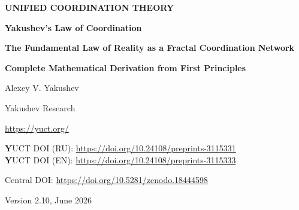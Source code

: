 \documentclass[12pt,a4paper]{article}
\theoremstyle{remark}
\begin{document}
	
	\begin{titlepage}
		\centering
		\vspace*{2cm}
		
		{\Huge\bfseries UNIFIED COORDINATION THEORY\par}
		\vspace*{2cm}
		
		{\Huge\bfseries Yakushev's Law of Coordination\par}
		\vspace{0.5cm}
		{\Large\bfseries The Fundamental Law of Reality as a Fractal Coordination Network\par}
		\vspace{0.3cm}
		{\Large\bfseries Complete Mathematical Derivation from First Principles\par}
		
		\vspace{1.5cm}
		
		{\large Alexey V. Yakushev\par}
		\vspace{0.3cm}
		{\normalsize Yakushev Research\par}
		\vspace{0.2cm}
		{\normalsize \url{https://yuct.org/}\par}
		
		\vspace{2cm}
		\large 
		\textbf YUCT DOI (RU): \url{https://doi.org/10.24108/preprints-3115331} \\
		\textbf YUCT DOI (EN): \url{https://doi.org/10.24108/preprints-3115333}
		
		\vspace{1cm}
		
		\vspace{0cm}
		
		Central DOI: \url{https://doi.org/10.5281/zenodo.18444598}\\
		
		\vspace{1.0cm}
		{\normalsize Version 2.10, June 2026\par}
		

\end{titlepage}
\end{document}
